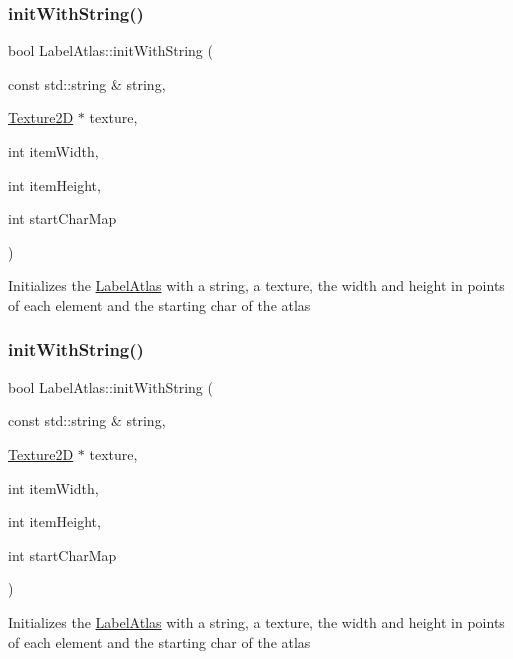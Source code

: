 \subsubsection{\texorpdfstring{init\+With\+String()}{initWithString()}\hspace{0.1cm}{\footnotesize\ttfamily [5/6]}}
{\footnotesize\ttfamily bool Label\+Atlas\+::init\+With\+String (\begin{DoxyParamCaption}\item[{const std\+::string \&}]{string,  }\item[{\hyperlink{classTexture2D}{Texture2D} $\ast$}]{texture,  }\item[{int}]{item\+Width,  }\item[{int}]{item\+Height,  }\item[{int}]{start\+Char\+Map }\end{DoxyParamCaption})}

Initializes the \hyperlink{classLabelAtlas}{Label\+Atlas} with a string, a texture, the width and height in points of each element and the starting char of the atlas \mbox{\label{classLabelAtlas_a48d27c81829144f2e2e6644e56e065be}} 
\subsubsection{\texorpdfstring{init\+With\+String()}{initWithString()}\hspace{0.1cm}{\footnotesize\ttfamily [6/6]}}
{\footnotesize\ttfamily bool Label\+Atlas\+::init\+With\+String (\begin{DoxyParamCaption}\item[{const std\+::string \&}]{string,  }\item[{\hyperlink{classTexture2D}{Texture2D} $\ast$}]{texture,  }\item[{int}]{item\+Width,  }\item[{int}]{item\+Height,  }\item[{int}]{start\+Char\+Map }\end{DoxyParamCaption})}

Initializes the \hyperlink{classLabelAtlas}{Label\+Atlas} with a string, a texture, the width and height in points of each element and the starting char of the atlas \mbox{\label{classLabelAtlas_af70aa9b7820b00dfc6aa2c7291532fd6}} 
